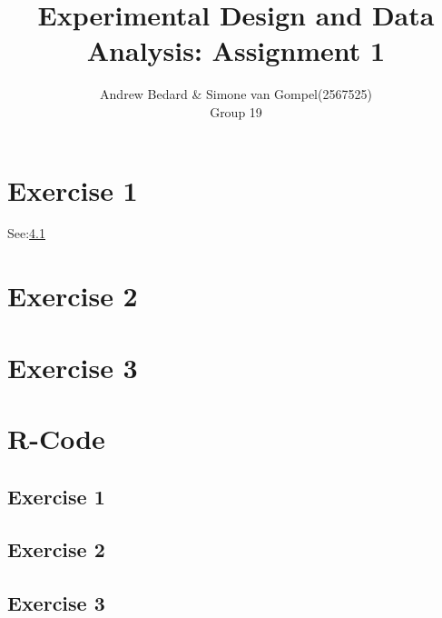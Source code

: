 \documentclass{article}
\title{Experimental Design and Data Analysis: Assignment 1}
\author{Andrew Bedard \& Simone van Gompel(2567525) \\ Group 19}
\begin{document}
  \section{Exercise 1}
    See:\ref{sub:R1}

  \section{Exercise 2}

  \section{Exercise 3}

  \section{R-Code}
    \subsection{Exercise 1}\label{sub:R1}

    \subsection{Exercise 2}\label{sub:R2}

    \subsection{Exercise 3}\label{sub:R3}
\end{document}
